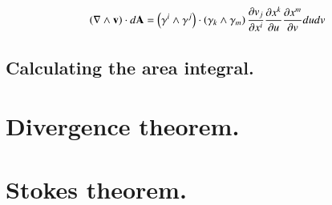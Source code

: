 \documentclass{article}
\newcommand{\grad}[0]{\nabla}
\newcommand{\PD}[2]{\frac{\partial {#2}}{\partial {#1}}}
\begin{document}
\begin{align*}
\left(\grad \wedge \Bv\right) \cdot d\BA
&= \left( \gamma^i \wedge \gamma^j \right) \cdot \left(\gamma_k \wedge \gamma_m \right) \PD{x^{i}}{v_j} \PD{u}{x^k} \PD{v}{x^m} du dv \\
\end{align*}

\subsection{ Calculating the area integral. }

\section{ Divergence theorem. }

\section{ Stokes theorem. }
\end{document}
